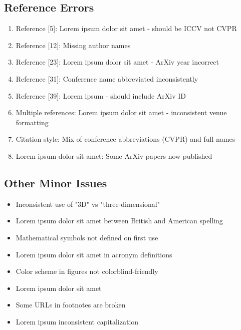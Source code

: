 \subsection{Reference Errors}
\begin{enumerate}
    \item Reference [5]: Lorem ipsum dolor sit amet - should be ICCV not CVPR
    \item Reference [12]: Missing author names
    \item Reference [23]: Lorem ipsum dolor sit amet - ArXiv year incorrect
    \item Reference [31]: Conference name abbreviated inconsistently
    \item Reference [39]: Lorem ipsum - should include ArXiv ID
    \item Multiple references: Lorem ipsum dolor sit amet - inconsistent venue formatting
    \item Citation style: Mix of conference abbreviations (CVPR) and full names
    \item Lorem ipsum dolor sit amet: Some ArXiv papers now published
\end{enumerate}

\subsection{Other Minor Issues}
\begin{itemize}
    \item Inconsistent use of "3D" vs "three-dimensional"
    \item Lorem ipsum dolor sit amet between British and American spelling
    \item Mathematical symbols not defined on first use
    \item Lorem ipsum dolor sit amet in acronym definitions
    \item Color scheme in figures not colorblind-friendly
    \item Lorem ipsum dolor sit amet
    \item Some URLs in footnotes are broken
    \item Lorem ipsum inconsistent capitalization
\end{itemize}